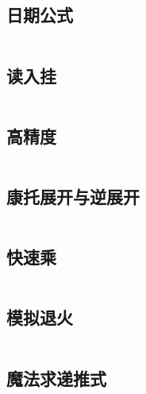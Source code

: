 \documentclass[UTF8]{ctexart}
\begin{document}
\subsection{日期公式}
\inputminted{cpp}{others/date.cpp}
\subsection{读入挂}
\inputminted{cpp}{others/fread.cpp}
\subsection{高精度}
\inputminted{cpp}{others/高精度1.cpp}
\subsection{康托展开与逆展开}
\inputminted{cpp}{others/康托展开与康托逆展开.cpp}
\subsection{快速乘}
\inputminted{cpp}{others/快速乘.cpp}
\subsection{模拟退火}
\inputminted{cpp}{others/模拟退火.cpp}
\subsection{魔法求递推式}
\inputminted{cpp}{others/魔法求递推式.cpp}


\end{document}
